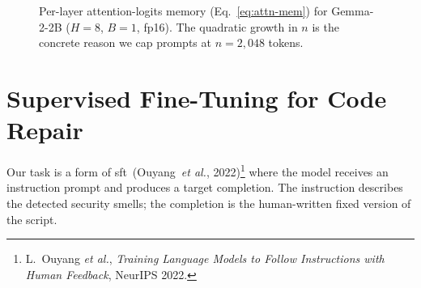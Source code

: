 \documentclass[12pt, a4paper]{report}
\begin{document}
\begin{figure}[H]
  \centering
  \caption[Attention memory scaling]{Per-layer attention-logits memory
           (Eq.~\eqref{eq:attn-mem}) for Gemma-2-2B
           ($H=8$, $B=1$, fp16). The quadratic growth in $n$ is the
           concrete reason we cap prompts at $n=2{,}048$ tokens.}
  \label{fig:attn-scaling}
\end{figure}

\section{Supervised Fine-Tuning for Code Repair}
\label{sec:sft}

Our task is a form of \gls{sft}~(Ouyang~\emph{et al.}, 2022)\footnote{L.~Ouyang
\emph{et al.}, \emph{Training Language Models to Follow Instructions with
Human Feedback}, NeurIPS 2022.} where the model receives an instruction
prompt and produces a target completion. The instruction describes the
detected security smells; the completion is the human-written fixed
version of the script.
\end{document}
